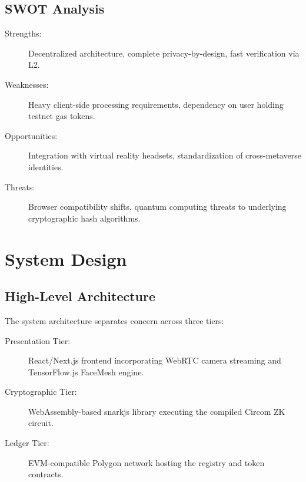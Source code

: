\documentclass[12pt,a4paper,oneside]{report}
\begin{document}
\section{SWOT Analysis}
\begin{description}
    \item[Strengths:] Decentralized architecture, complete privacy-by-design, fast verification via L2.
    \item[Weaknesses:] Heavy client-side processing requirements, dependency on user holding testnet gas tokens.
    \item[Opportunities:] Integration with virtual reality headsets, standardization of cross-metaverse identities.
    \item[Threats:] Browser compatibility shifts, quantum computing threats to underlying cryptographic hash algorithms.
\end{description}

\newpage

\chapter{System Design}

\section{High-Level Architecture}
The system architecture separates concern across three tiers:
\begin{description}
    \item[Presentation Tier:] React/Next.js frontend incorporating WebRTC camera streaming and TensorFlow.js FaceMesh engine.
    \item[Cryptographic Tier:] WebAssembly-based snarkjs library executing the compiled Circom ZK circuit.
    \item[Ledger Tier:] EVM-compatible Polygon network hosting the registry and token contracts.
\end{description}
\end{document}
